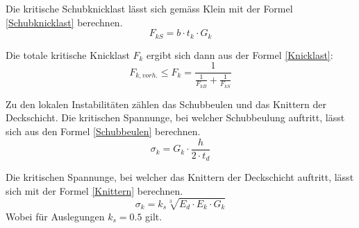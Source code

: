     Die kritische Schubknicklast lässt sich gemäss Klein \cite{klein} mit der Formel \ref{Schubknicklast} berechnen.
    \begin{equation}
      \label{Schubknicklast}
      F_{kS} = b \cdot t_k \cdot G_k
    \end{equation}

    Die totale kritische Knicklast \(F_k\) ergibt sich dann aus der Formel \ref{Knicklast}:
    \begin{equation}
      \label{Knicklast}
      F_{k, vorh.} \leq F_k=\frac{1}{\frac{1}{F_{kB}}+\frac{1}{F_{kS}}}
    \end{equation}

    Zu den lokalen Instabilitäten zählen das Schubbeulen und das Knittern der Deckschicht. Die kritischen Spannunge, bei welcher Schubbeulung auftritt, lässt sich aus den Formel \ref{Schubbeulen} berechnen. \cite{ETH}
    \begin{equation}
      \label{Schubbeulen}
      \sigma_k = G_k \cdot \frac{h}{2 \cdot t_d}
    \end{equation}

    Die kritischen Spannunge, bei welcher das Knittern der Deckschicht auftritt, lässt sich mit der Formel \ref{Knittern} berechnen. \cite{ETH}
    \begin{equation}
      \label{Knittern}
      \sigma_k = k_s\sqrt[3]{E_d \cdot E_k \cdot G_k}
    \end{equation}
    Wobei für Auslegungen \(k_s = 0.5\) gilt.

